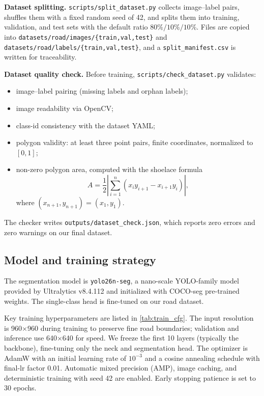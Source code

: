 \documentclass[11pt,a4paper]{article}
\newcommand{\tool}[1]{\texttt{#1}}
\newcommand{\modelname}{\tool{yolo26n-seg}}
\begin{document}
\textbf{Dataset splitting.} \tool{scripts/split\_dataset.py} collects image--label pairs, shuffles them with a fixed random seed of 42, and splits them into training, validation, and test sets with the default ratio $80\% / 10\% / 10\%$. Files are copied into \tool{datasets/road/images/\{train,val,test\}} and \tool{datasets/road/labels/\{train,val,test\}}, and a \tool{split\_manifest.csv} is written for traceability.

\textbf{Dataset quality check.} Before training, \tool{scripts/check\_dataset.py} validates:
\begin{itemize}[leftmargin=2em]
    \item image--label pairing (missing labels and orphan labels);
    \item image readability via OpenCV;
    \item class-id consistency with the dataset YAML;
    \item polygon validity: at least three point pairs, finite coordinates, normalized to $[0,1]$;
    \item non-zero polygon area, computed with the shoelace formula
    \begin{equation}\label{eq:area}
        A = \frac{1}{2}\left|\sum_{i=1}^{n} (x_i y_{i+1} - x_{i+1} y_i)\right|,
    \end{equation}
    where $(x_{n+1},y_{n+1})=(x_1,y_1)$.
\end{itemize}
The checker writes \tool{outputs/dataset\_check.json}, which reports zero errors and zero warnings on our final dataset.

\subsection{Model and training strategy}

The segmentation model is \modelname{}, a nano-scale YOLO-family model provided by Ultralytics v8.4.112 and initialized with COCO-seg pre-trained weights. The single-class head is fine-tuned on our road dataset.

Key training hyperparameters are listed in \cref{tab:train_cfg}. The input resolution is 960$\times$960 during training to preserve fine road boundaries; validation and inference use 640$\times$640 for speed. We freeze the first 10 layers (typically the backbone), fine-tuning only the neck and segmentation head. The optimizer is AdamW with an initial learning rate of $10^{-3}$ and a cosine annealing schedule with final-lr factor 0.01. Automatic mixed precision (AMP), image caching, and deterministic training with seed 42 are enabled. Early stopping patience is set to 30 epochs.
\end{document}
